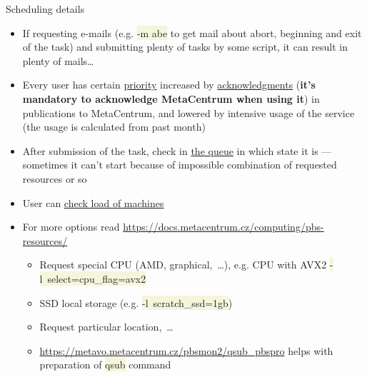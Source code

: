 \documentclass[compress, xelatex, 11pt, xcolor=svgnames, aspectratio=169,
	hyperref={
		bookmarks=true,
		unicode=true,
		colorlinks=true,
		pdftitle={Linux, command line and MetaCentrum},
		plainpages=false,
		pdfauthor={Vojtech Zeisek},
		pdfsubject={Course about use of Linux command line, writing shell scripts and using MetaCentrum of CESNET},
		pdfcreator={XeLaTeX},
		pdfkeywords={Linux, GNU, BASH, shell, command line, MetaCentrum},
		linkcolor=DarkRed, %
		anchorcolor=DarkBlue, %
		citecolor=Indigo, %
		filecolor=NavyBlue, %
		menucolor=DarkMagenta, %
		urlcolor=DarkBlue, %
		},
	url={hyphens, lowtilde} %
	]{beamer}
\renewcommand{\texttt}[1]{\colorbox{Beige}{{\ttfamily #1}}}
\begin{document}
\begin{frame}[allowframebreaks]{Scheduling details}
\begin{itemize}
\begin{itemize}
		\end{itemize}
		\item If requesting e-mails (e.g. \texttt{-m abe} to get mail about abort, beginning and exit of the task) and submitting plenty of tasks by some script, it can result in plenty of mails\ldots
		\item Every user has certain \href{https://metavo.metacentrum.cz/pbsmon2/users/}{priority} increased by \href{https://docs.metacentrum.cz/access/terms/\#acknowledgements-and-publications}{acknowledgments} (\textbf{it's mandatory to acknowledge MetaCentrum when using it}) in publications to MetaCentrum, and lowered by intensive usage of the service (the usage is calculated from past month)
		\item After submission of the task, check in \href{https://metavo.metacentrum.cz/pbsmon2/queues/jobsQueued}{the queue} in which state it is --- sometimes it can't start because of impossible combination of requested resources or so
		\item User can \href{https://metavo.metacentrum.cz/pbsmon2/nodes/physical}{check load of machines}
		\item For more options read \url{https://docs.metacentrum.cz/computing/pbs-resources/}
		\begin{itemize}
			\item Request special CPU (AMD, graphical,~\ldots), e.g. CPU with AVX2 \texttt{-l~select=cpu\_flag=avx2}
			\item SSD local storage (e.g. \texttt{-l~scratch\_ssd=1gb})
			\item Request particular location,~\ldots
			\item \url{https://metavo.metacentrum.cz/pbsmon2/qsub_pbspro} helps with preparation of \texttt{qsub} command
		\end{itemize}
	\end{itemize}
\end{frame}
\end{document}
